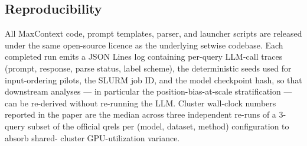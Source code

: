 \subsection{Reproducibility}

All MaxContext code, prompt templates, parser, and launcher scripts are
released under the same open-source licence as the underlying setwise
codebase. Each completed run emits a JSON Lines log containing per-query
LLM-call traces (prompt, response, parse status, label scheme), the
deterministic seeds used for input-ordering pilots, the SLURM job ID, and
the model checkpoint hash, so that downstream analyses --- in particular
the position-bias-at-scale stratification --- can be re-derived without
re-running the LLM. Cluster wall-clock numbers reported in the paper are
the median across three independent re-runs of a 3-query subset of the
official qrels per (model, dataset, method) configuration to absorb shared-
cluster GPU-utilization variance.

